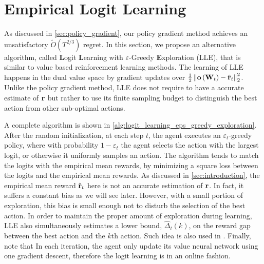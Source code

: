 \section{Empirical Logit Learning}
\label{sec:logit_learning}

As discussed in \cref{sec:policy_gradient}, our policy gradient method achieves an unsatisfactory $\tilde{O}(T^{2/3})$ regret.
In this section, we propose an alternative algorithm, called {\bf L}ogit {\bf L}earning with $\varepsilon$-Greedy {\bf E}xploration (LLE), that is similar to value based reinforcement learning methods.
The learning of LLE happens in the dual value space by gradient updates over $\frac{1}{2} \left\| {\mathbf{o}}\left( {\mathbf{W}}_t\right) - \hat{{\mathbf{r}}}_t \right\|_2^2$.
Unlike the policy gradient method, LLE does not require to have a accurate estimate of ${\mathbf{r}}$ but rather to use its finite sampling budget to distinguish the best action from other sub-optimal actions.

A complete algorithm is shown in \cref{alg:logit_learning_eps_greedy_exploration}. 
After the random initialization, at each step $t$, the agent executes an $\varepsilon_t$-greedy policy, where with probability $1 - \varepsilon_t$ the agent selects the action with the largest logit, or otherwise it uniformly samples an action.
The algorithm tends to match the logits with the empirical mean rewards, by minimizing a square loss between the logits and the empirical mean rewards.
As discussed in \cref{sec:introduction}, the empirical mean reward $\hat{{\mathbf{r}}}_t$ here is not an accurate estimation of ${\mathbf{r}}$. In fact, it suffers a constant bias as we will see later.
However, with a small portion of exploration, this bias is small enough not to disturb the selection of the best action.
In order to maintain the proper amount of exploration during learning, 
LLE also simultaneously estimates a lower bound, $\hat{\Delta}_t(k)$, on the reward gap between the best action and the $k$th action. 
Such idea is also used in  \cite{seldin2017improved}.
Finally, note that In each iteration, the agent only update its value neural network using one gradient descent, therefore the logit learning is in an online fashion.

